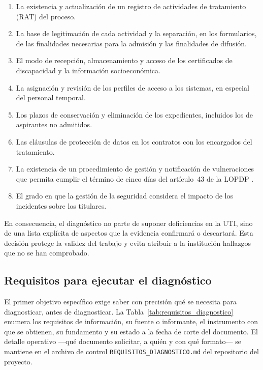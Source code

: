 \begin{enumerate}
  \item La existencia y actualización de un registro de actividades de tratamiento (RAT) del proceso.
  \item La base de legitimación de cada actividad y la separación, en los formularios, de las finalidades necesarias para la admisión y las finalidades de difusión.
  \item El modo de recepción, almacenamiento y acceso de los certificados de discapacidad y la información socioeconómica.
  \item La asignación y revisión de los perfiles de acceso a los sistemas, en especial del personal temporal.
  \item Los plazos de conservación y eliminación de los expedientes, incluidos los de aspirantes no admitidos.
  \item Las cláusulas de protección de datos en los contratos con los encargados del tratamiento.
  \item La existencia de un procedimiento de gestión y notificación de vulneraciones que permita cumplir el término de cinco días del artículo~43 de la LOPDP \cite[art.~43]{lopdp2021}.
  \item El grado en que la gestión de la seguridad considera el impacto de los incidentes sobre los titulares.
\end{enumerate}

En consecuencia, el diagnóstico no parte de suponer deficiencias en la UTI, sino de una lista explícita de aspectos que la evidencia confirmará o descartará. Esta decisión protege la validez del trabajo y evita atribuir a la institución hallazgos que no se han comprobado.

\subsection{Requisitos para ejecutar el diagnóstico}
\label{sec:requisitos_diagnostico}

El primer objetivo específico exige saber con precisión qué se necesita para diagnosticar, antes de diagnosticar. La Tabla~\ref{tab:requisitos_diagnostico} enumera los requisitos de información, su fuente o informante, el instrumento con que se obtienen, su fundamento y su estado a la fecha de corte del documento. El detalle operativo ---qué documento solicitar, a quién y con qué formato--- se mantiene en el archivo de control \texttt{REQUISITOS\_DIAGNOSTICO.md} del repositorio del proyecto.

